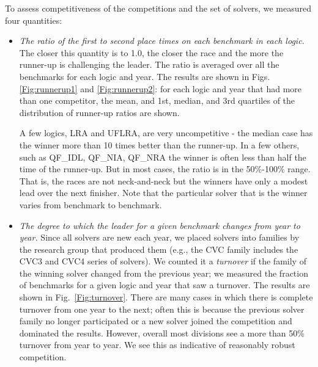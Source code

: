\documentclass[smallcondensed]{svjour3}
\begin{document}
To assess competitiveness of the competitions and the set of solvers, we measured four quantities:
\begin{itemize}
\item {\em The ratio of the first to second place times on each benchmark in each logic.} The closer this quantity is to 1.0, the closer the race and the more the runner-up is challenging the leader. The ratio is averaged over all the benchmarks for each logic and year. The results are shown in Figs. \ref{Fig:runnerup1} and \ref{Fig:runnerup2}: for each logic and year that had more than one competitor, the mean, and 1st, median, and 3rd quartiles of the distribution of runner-up ratios are shown. 

A few logics, LRA and UFLRA, are very uncompetitive - the median case has the winner more than 10 times better than the runner-up. In a few others, such as QF\_IDL, QF\_NIA, QF\_NRA the winner is often less than half the time of the runner-up. But in most cases, the ratio is in the 50\%-100\% range. That is, the races are not neck-and-neck but the winners have only a modest lead over the next finisher. Note that the particular solver that is the winner varies from benchmark to benchmark.

\item {\em The degree to which the leader for a given benchmark changes from year to year.} Since all solvers are new each year, we placed solvers into families by the research group that produced them (e.g., the CVC family includes the CVC3 and CVC4 series of solvers). We counted it a {\em turnover} if the family of the winning solver changed from the previous year; we measured the fraction of benchmarks for a given logic and year that saw a turnover. The results are shown in 
Fig.~\ref{Fig:turnover}. There are many cases in which there is complete turnover from one year to the next; often this is because the previous solver family no longer participated or a new solver joined the competition and dominated the results. However, overall most
divisions see a more than 50\% turnover from year to year. We see this as indicative of reasonably robust competition.




\end{itemize}
\end{document}
